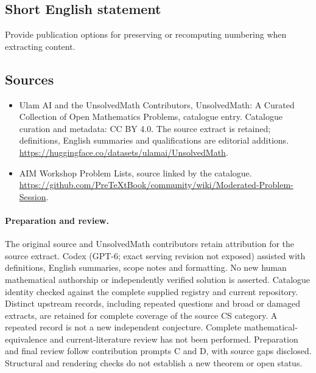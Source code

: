 \documentclass[11pt]{article}
\begin{document}
\subsection{Short English statement}
Provide publication options for preserving or recomputing numbering when extracting content.
\subsection{Sources}
\begin{itemize}
\item[\hypertarget{source:statement:1}{S1}] Ulam AI and the UnsolvedMath Contributors, UnsolvedMath: A Curated Collection of Open Mathematics Problems, catalogue entry. Catalogue curation and metadata: CC BY 4.0. The source extract is retained; definitions, English summaries and qualifications are editorial additions.
\url{https://huggingface.co/datasets/ulamai/UnsolvedMath}.
\item[\hypertarget{source:statement:2}{S2}] AIM Workshop Problem Lists, source linked by the catalogue.
\url{https://github.com/PreTeXtBook/community/wiki/Moderated-Problem-Session}.
\end{itemize}
\paragraph{Preparation and review.}
The original source and UnsolvedMath contributors retain attribution for the source extract. Codex (GPT-6; exact serving revision not exposed) assisted with definitions, English summaries, scope notes and formatting. No new human mathematical authorship or independently verified solution is asserted. Catalogue identity checked against the complete supplied registry and current repository. Distinct upstream records, including repeated questions and broad or damaged extracts, are retained for complete coverage of the source CS category. A repeated record is not a new independent conjecture. Complete mathematical-equivalence and current-literature review has not been performed. Preparation and final review follow contribution prompts C and D, with source gaps disclosed. Structural and rendering checks do not establish a new theorem or open status.
\label{end:statement}
\end{document}
